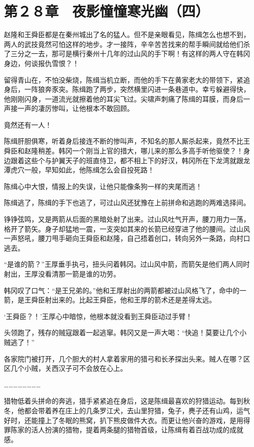 \section{第２８章　夜影憧憧寒光幽（四）}

赵隆和王舜臣都是在秦州城出了名的猛人。但不是亲眼看见，陈缉怎么也想不到，两人的武技竟然可怕这样的地步。才一接阵，辛辛苦苦找来的帮手瞬间就给他们杀了三分之一去，那可是横行秦州十几年的过山风的手下啊！有这样的两人守在韩冈身边，何谈报仇雪恨？！

留得青山在，不怕没柴烧，陈缉当机立断，而他的手下在黄家老大的带领下，紧追身后，一阵狼奔豕突。陈缉跑了两步，突然横里闪进一条巷道中。幸亏躲避得快，他刚刚闪身，一道流光就擦着他的耳尖飞过。尖啸声刺痛了陈缉的耳膜，而身后一声接一声的凄厉惨叫，让他根本不敢回顾。

竟然还有一人！

陈缉肝胆俱寒，听着身后接连不断的惨叫声，不知名的那人厮杀起来，竟然不比王舜臣和赵隆稍差。韩冈一个刚当上官的措大，哪儿来的那么多高手听他驱使？！身边跟着这些个与护翼天子的班直侍卫，都不相上下的好汉，韩冈所在下龙湾就跟龙潭虎穴一般，早知如此，他陈缉怎么会自投死路！

陈缉心中大恨，情报上的失误，让他只能像条狗一样的夹尾而逃！

陈缉逃了，陈缉的手下也逃了，可过山风还犹豫在上前拼命和逃跑的两难选择间。

铮铮弦鸣，又是两箭从后面的黑暗处射了出来。过山风吐气开声，腰刀用力一荡，格开了箭矢。身子却猛地一震，一支突如其来的长箭已经穿进了他的腰间。过山风一声怒吼，腰刀甩手砸向王舜臣和赵隆，自己捂着创口，转向另外一条路，向村口逃去。

“是谁的箭？”王厚垂手执弓，扭头问着韩冈。过山风中箭，而箭矢是他们两人同时射出，王厚没看清那一箭是谁的功劳。

韩冈叹了口气：“是王兄弟的。”他和王厚射出的两箭都被过山风格飞了，命中的一箭，是王舜臣射出来的。比起王舜臣，他和王厚的箭术还是差得太远。

‘王舜臣？！’王厚心中暗惊，他根本就没看到王舜臣动过手臂！

头领跑了，残存的贼寇跟着一起逃窜。韩冈又是一声大喝：“快追！莫要让几个小贼逃了！”

各家院门被打开，几个胆大的村人拿着家用的猎弓和长矛探出头来。贼人在哪？区区几个小贼，关西汉子可不会放在心上。

……………………

猎物低着头拼命的奔逃，猎手紧紧追在身后，这是陈缉最喜欢的狩猎运动。每到秋冬，他都会带着养在庄上的几条罗江犬，去山里狩猎，兔子，麂子还有山鸡，运气好时，还能撞上了冬眠的熊窝，扒下熊皮做件大衣。而更让他兴奋的游戏，是用得罪陈家的活人扮演的猎物，提着两条腿的猎物首级，让陈缉有着百战功成的成就感。

